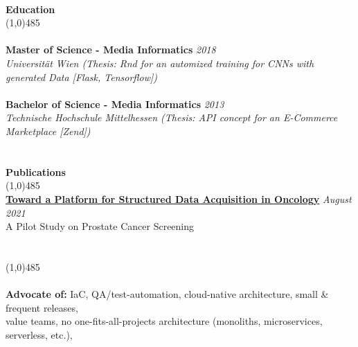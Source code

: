 \documentclass[9pt]{extarticle}
\newcommand\tab[1][1cm]{\hspace*{#1}}
\newcommand\smallspace[1][0.23cm]{\hspace*{#1}}
\newcommand\negativespace[1][-0.12cm]{\hspace*{#1}}
\begin{document}
\noindent %
\\
\vspace*{-6pt}
{\negativespace \Large \bf Education}\\
\line(1,0){485}\\
\\
\noindent
{\bf Master of Science - Media Informatics} \hfill \textit{2018} \\ 
\textit{Universität Wien (Thesis: Rnd for an automized training for CNNs with generated Data [Flask, Tensorflow])} \\\\
\noindent
{\bf Bachelor of Science - Media Informatics} \hfill \textit{2013} \\
\textit{Technische Hochschule Mittelhessen (Thesis: API concept for an E-Commerce Marketplace [Zend])} \\
\\
\\
\vspace*{-6pt}
{\negativespace \Large \bf Publications}\\
\line(1,0){485}\\
{\bf \href{https://www.researchgate.net/publication/354259954_Toward_a_Platform_for_Structured_Data_Acquisition_in_Oncology_A_Pilot_Study_on_Prostate_Cancer_Screening}{Toward a Platform for Structured Data Acquisition in Oncology}} \hfill \textit{August 2021} \\ 
A Pilot Study on Prostate Cancer Screening \\ 
\\
\\
\line(1,0){485}\\
\\
\noindent
{\bf Advocate of:} IaC, QA/test-automation, cloud-native architecture, small \& frequent releases,\\ 
 \tab \tab \smallspace value teams, no one-fits-all-projects architecture (monoliths, microservices, serverless, etc.), \\
\end{document}
